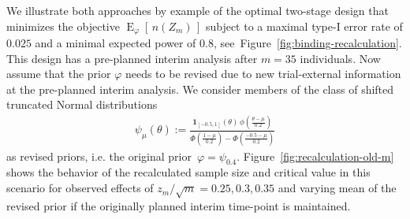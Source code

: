 \documentclass[12pt]{article}
\newcommand{\E}{\ensuremath{\operatorname{E}}}
\begin{document}
We illustrate both approaches by example of the optimal two-stage design that minimizes the objective
$\E_\varphi[\,n(Z_m)\,]$ subject to a maximal type-I error rate of $0.025$ and a minimal expected power of $0.8$, see~Figure~\ref{fig:binding-recalculation}.
This design has a pre-planned interim analysis after $m=35$ individuals.
Now assume that
the prior $\varphi$ needs to be revised due to new trial-external
information at the pre-planned interim analysis.
We consider members of the class of shifted truncated Normal distributions
\begin{align}
    \psi_{\mu}(\theta) := \frac{\displaystyle \boldsymbol{1}_{[-0.5, 1]}(\theta)\,\phi\left(\frac{\theta - \mu}{0.2}\right)}{\displaystyle \Phi\left(\frac{1 - \mu}{0.2}\right) - \Phi\left(\frac{-0.5 - \mu}{0.2}\right)}
\end{align}
as revised priors, i.e. the original prior~$\varphi=\psi_{0.4}$.
Figure~\ref{fig:recalculation-old-m} shows the behavior of the recalculated sample size and critical value in this scenario for observed effects of $z_m/\sqrt{m}=0.25, 0.3, 0.35$ and varying mean of the revised prior if the originally planned interim time-point is maintained.
\end{document}
